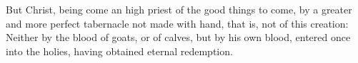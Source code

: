 But Christ, being come an high priest of the good things to come, by a greater and more perfect tabernacle not made with hand, that is, not of this creation: Neither by the blood of goats, or of calves, but by his own blood, entered once into the holies, having obtained eternal redemption.